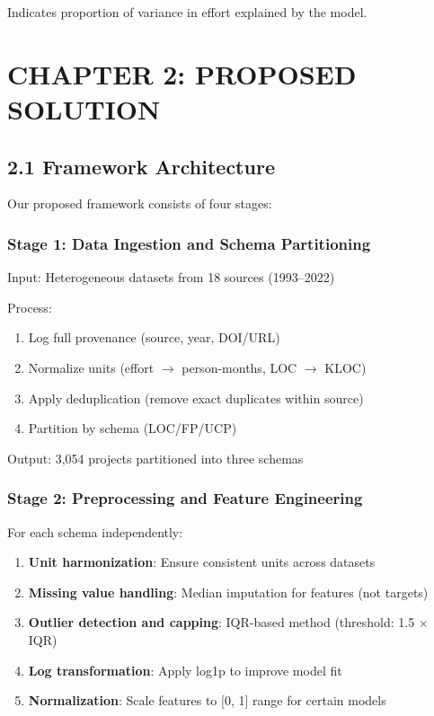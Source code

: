 \documentclass[11pt,a4paper]{article}
\begin{document}
Indicates proportion of variance in effort explained by the model.

\newpage

\section{CHAPTER 2: PROPOSED SOLUTION}

\subsection{2.1 Framework Architecture}

Our proposed framework consists of four stages:

\subsubsection{Stage 1: Data Ingestion and Schema Partitioning}

Input: Heterogeneous datasets from 18 sources (1993--2022)

Process:
\begin{enumerate}
    \item Log full provenance (source, year, DOI/URL)
    \item Normalize units (effort $\to$ person-months, LOC $\to$ KLOC)
    \item Apply deduplication (remove exact duplicates within source)
    \item Partition by schema (LOC/FP/UCP)
\end{enumerate}

Output: 3,054 projects partitioned into three schemas

\subsubsection{Stage 2: Preprocessing and Feature Engineering}

For each schema independently:

\begin{enumerate}
    \item \textbf{Unit harmonization}: Ensure consistent units across datasets
    \item \textbf{Missing value handling}: Median imputation for features (not targets)
    \item \textbf{Outlier detection and capping}: IQR-based method (threshold: 1.5 $\times$ IQR)
    \item \textbf{Log transformation}: Apply log1p to improve model fit
    \item \textbf{Normalization}: Scale features to [0, 1] range for certain models
\end{enumerate}
\end{document}
